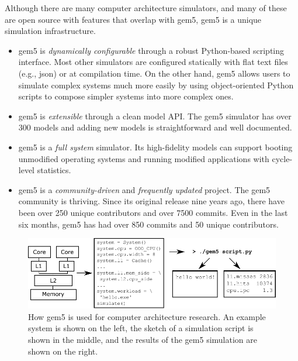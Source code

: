Although there are many computer architecture simulators, and many of these are open source with features that overlap with gem5, gem5 is a unique simulation infrastructure.
\begin{itemize}
    \item gem5 is \emph{dynamically configurable} through a robust Python-based scripting interface. Most other simulators are configured statically with flat text files (e.g., json) or at compilation time. On the other hand, gem5 allows users to simulate complex systems much more easily by using object-oriented Python scripts to compose simpler systems into more complex ones.
    \item gem5 is \emph{extensible} through a clean model API. The gem5 simulator has over 300 models and adding new models is straightforward and well documented.
    \item gem5 is a \emph{full system} simulator. Its high-fidelity models can support booting unmodified operating systems and running modified applications with cycle-level statistics.
    \item gem5 is a \emph{community-driven} and \emph{frequently updated} project. The gem5 community is thriving. Since its original release nine years ago, there have been over 250 unique contributors and over 7500 commits. Even in the last six months, gem5 has had over 850 commits and 50 unique contributors.
\end{itemize}

\begin{figure}
  \centering
  \includegraphics[width=0.7\linewidth]{fig/gem5-usage}
  \caption{How gem5 is used for computer architecture research. An example system is shown on the left, the sketch of a simulation script is shown in the middle, and the results of the gem5 simulation are shown on the right.}
  \label{fig:gem5-usage}
\end{figure}

